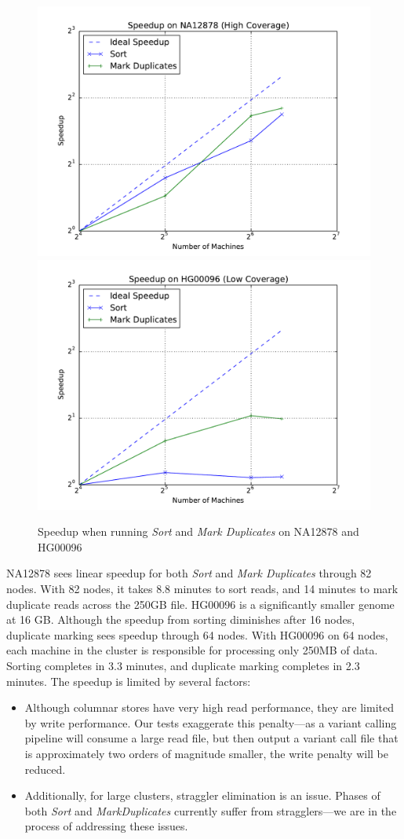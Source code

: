 \documentclass{bioinfo}
\begin{document}
\begin{figure}[h]
\begin{center}
\includegraphics[width=0.49\linewidth]{graphs/speedup_na12878.pdf}
\includegraphics[width=0.49\linewidth]{graphs/speedup_hg00096.pdf}
\end{center}
\caption{Speedup when running \textit{Sort} and \textit{Mark Duplicates} on NA12878 and HG00096}
\label{fig:speedup}
\end{figure}

NA12878 sees linear speedup for both \textit{Sort} and \textit{Mark Duplicates} through 82 nodes. With 82 nodes, it takes 8.8 minutes to sort reads, and 14 minutes to
mark duplicate reads across the 250GB file. HG00096 is a significantly smaller genome at 16 GB. Although the speedup from sorting diminishes after 16 nodes, duplicate
marking sees speedup through 64 nodes. With HG00096 on 64 nodes, each machine in the cluster is responsible for processing only 250MB of data. Sorting completes in
3.3 minutes, and duplicate marking completes in 2.3 minutes. The speedup is limited by several factors:

\begin{itemize}
\item Although columnar stores have very high read performance, they are limited by write performance. Our tests exaggerate this penalty---as a variant calling pipeline will
consume a large read file, but then output a variant call file that is approximately two orders of magnitude smaller, the write penalty will be reduced.
\item Additionally, for large clusters, straggler elimination is an issue. Phases of both \textit{Sort} and \textit{MarkDuplicates} currently suffer from stragglers---we are in
the process of addressing these issues.
\end{itemize}
\end{document}
